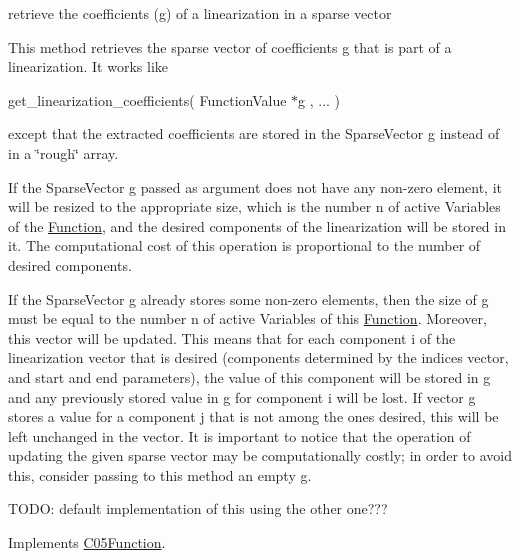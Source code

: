 retrieve the coefficients (g) of a linearization in a sparse vector 

This method retrieves the sparse vector of coefficients g that is part of a linearization. It works like

get\+\_\+linearization\+\_\+coefficients( Function\+Value $\ast$g , ... )

except that the extracted coefficients are stored in the Sparse\+Vector g instead of in a \char`\"{}rough\char`\"{} array.

If the Sparse\+Vector g passed as argument does not have any non-\/zero element, it will be resized to the appropriate size, which is the number n of active Variables of the \mbox{\hyperlink{class_s_m_spp__di__unipi__it_1_1_function}{Function}}, and the desired components of the linearization will be stored in it. The computational cost of this operation is proportional to the number of desired components.

If the Sparse\+Vector g already stores some non-\/zero elements, then the size of g must be equal to the number n of active Variables of this \mbox{\hyperlink{class_s_m_spp__di__unipi__it_1_1_function}{Function}}. Moreover, this vector will be updated. This means that for each component i of the linearization vector that is desired (components determined by the indices vector, and start and end parameters), the value of this component will be stored in g and any previously stored value in g for component i will be lost. If vector g stores a value for a component j that is not among the ones desired, this will be left unchanged in the vector. It is important to notice that the operation of updating the given sparse vector may be computationally costly; in order to avoid this, consider passing to this method an empty g.

T\+O\+DO\+: default implementation of this using the other one??? 

Implements \mbox{\hyperlink{class_s_m_spp__di__unipi__it_1_1_c05_function_a896415fd6afd72c28afaf6343c8f1805}{C05\+Function}}.

\mbox{\label{class_s_m_spp__di__unipi__it_1_1_linear_function_ad8c41e1b26609250375600fb998b1538}} 
